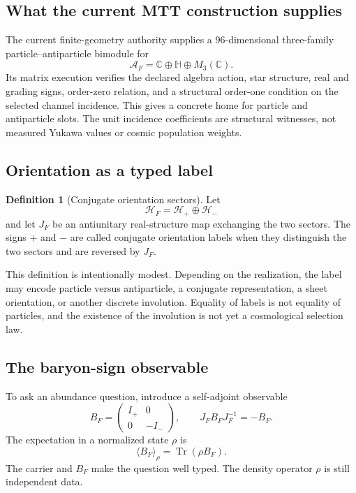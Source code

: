 \documentclass[11pt]{article}
\theoremstyle{definition}
\newtheorem{definition}{Definition}
\theoremstyle{remark}
\begin{document}
\subsection{What the current MTT construction supplies}

The current finite-geometry authority supplies a 96-dimensional
three-family particle--antiparticle bimodule for
\[
 \mathcal A_F=\mathbb C\oplus\mathbb H\oplus M_3(\mathbb C).
\]
Its matrix execution verifies the declared algebra action, star structure,
real and grading signs, order-zero relation, and a structural order-one
condition on the selected channel incidence.  This gives a concrete home for
particle and antiparticle slots.  The unit incidence coefficients are
structural witnesses, not measured Yukawa values or cosmic population
weights.

\subsection{Orientation as a typed label}

\begin{definition}[Conjugate orientation sectors]
Let
\[
 \mathcal H_F=\mathcal H_{+}\oplus\mathcal H_{-}
\]
and let $J_F$ be an antiunitary real-structure map exchanging the two sectors.
The signs $+$ and $-$ are called conjugate orientation labels when they
distinguish the two sectors and are reversed by $J_F$.
\end{definition}

This definition is intentionally modest.  Depending on the realization, the
label may encode particle versus antiparticle, a conjugate representation, a
sheet orientation, or another discrete involution.  Equality of labels is
not equality of particles, and the existence of the involution is not yet a
cosmological selection law.

\subsection{The baryon-sign observable}

To ask an abundance question, introduce a self-adjoint observable
\[
 B_F=
 \begin{pmatrix}
 I_{+} & 0\\
 0 & -I_{-}
 \end{pmatrix},
\qquad
 J_F B_F J_F^{-1}=-B_F.
\]
The expectation in a normalized state $\rho$ is
\[
 \langle B_F\rangle_\rho=\operatorname{Tr}(\rho B_F).
\]
The carrier and $B_F$ make the question well typed.  The density operator
$\rho$ is still independent data.
\end{document}
